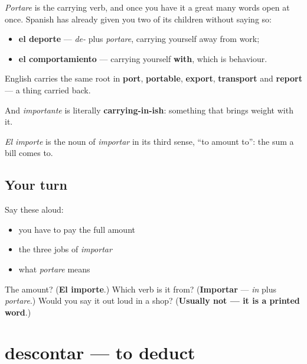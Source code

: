 \begin{cousinweb}
\emph{Portare} is the carrying verb, and once you have it a great many words open at once. Spanish has already given you two of its children without saying so:

\begin{itemize}
\raggedright
  \item \textbf{el deporte} — \emph{de-} plus \emph{portare}, carrying yourself away from work;
  \item \textbf{el comportamiento} — carrying yourself \textbf{with}, which is behaviour.
\end{itemize}

English carries the same root in \textbf{port}, \textbf{portable}, \textbf{export}, \textbf{transport} and \textbf{report} — a thing carried back.

And \emph{importante} is literally \textbf{carrying-in-ish}: something that brings weight with it.

\emph{El importe} is the noun of \emph{importar} in its third sense, \textquotedblleft{}to amount to\textquotedblright{}: the sum a bill comes to.
\end{cousinweb}

\subsection*{Your turn}
Say these aloud:

\begin{itemize}
\raggedright
  \item you have to pay the full amount
  \item the three jobs of \emph{importar}
  \item what \emph{portare} means
\end{itemize}

\begin{tcolorbox}[breakable,colback=teal!4,colframe=teal!35!black,title={Before you move on}]
The amount? (\textbf{El importe}.) Which verb is it from? (\textbf{Importar} — \emph{in} plus \emph{portare}.) Would you say it out loud in a shop? (\textbf{Usually not — it is a printed word}.)
\end{tcolorbox}
\section[descontar]{descontar — to deduct}

\label{lesson:ES-C474-descontar}



